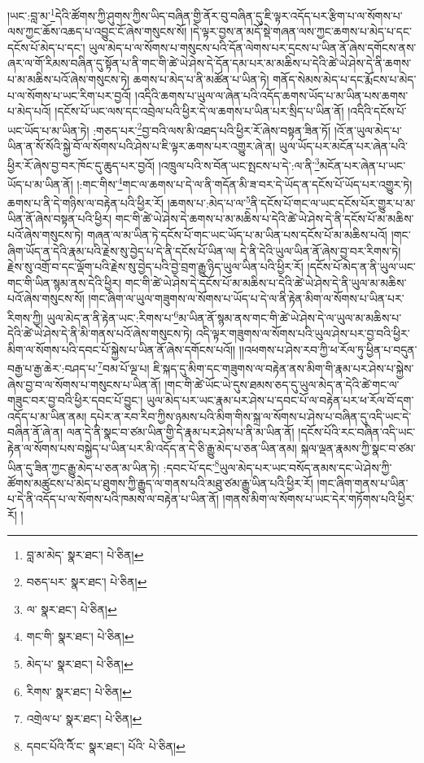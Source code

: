 །ཡང་:བླ་མ་\footnote{བླ་མ་མེད་  སྣར་ཐང་།  པེ་ཅིན། }དེའི་ཚོགས་ཀྱི་ཤུགས་ཀྱིས་ཡིད་བཞིན་གྱི་ནོར་བུ་བཞིན་དུ་ཇི་ལྟར་འདོད་པར་རྩིག་པ་ལ་སོགས་པ་ལས་ཀྱང་ཆོས་འཆད་པ་འབྱུང་ངོ་ཞེས་གསུངས་སོ། །དེ་ལྟར་བྱས་ན་མདོ་སྡེ་གཞན་ལས་ཀྱང་ཆགས་པ་མེད་པ་དང་དངོས་པོ་མེད་པ་དང་། ཡུལ་མེད་པ་ལ་སོགས་པ་གསུངས་པའི་དོན་ལེགས་པར་དྲངས་པ་ཡིན་ནོ་ཞེས་དགོངས་ནས་ཞར་ལ་གོ་རིམས་བཞིན་དུ་སྟོན་པ་ནི་གང་གི་ཚེ་ཡེ་ཤེས་དེ་དོན་དམ་པར་མ་མཆིས་པ་དེའི་ཚེ་ཡེ་ཤེས་དེ་ནི་ཆགས་པ་མ་མཆིས་པའོ་ཞེས་གསུངས་ཏེ། ཆགས་པ་མེད་པ་ནི་མཚོན་པ་ཡིན་ཏེ། གནོད་སེམས་མེད་པ་དང་རྨོངས་པ་མེད་པ་ལ་སོགས་པ་ཡང་རིག་པར་བྱའོ། །འདིའི་ཆགས་པ་ཡུལ་ལ་ཞེན་པའི་འདོད་ཆགས་ཡོད་པ་མ་ཡིན་པས་ཆགས་པ་མེད་པའོ། །དངོས་པོ་ཡང་ལས་དང་འབྲེལ་པའི་ཕྱིར་དེ་ལ་ཆགས་པ་ཡིན་པར་སྲིད་པ་ཡིན་ནོ། །འདིའི་དངོས་པོ་ཡང་ཡོད་པ་མ་ཡིན་ཏེ། :གཅད་པར་\footnote{བཅད་པར་  སྣར་ཐང་།  པེ་ཅིན། }བྱ་བའི་ལས་མི་འཐད་པའི་ཕྱིར་རོ་ཞེས་བསྟན་ཟིན་ཏོ། །འོ་ན་ཡུལ་མེད་པ་ཡིན་ན་སོ་སོའི་སྐྱེ་བོ་ལ་སོགས་པའི་ཤེས་པ་ཇི་ལྟར་ཆགས་པར་འགྱུར་ཞེ་ན། ཡུལ་ཡོད་པར་མངོན་པར་ཞེན་པའི་ཕྱིར་རོ་ཞེས་བྱ་བར་ཁོང་དུ་ཆུད་པར་བྱའོ། །འཁྲུལ་པའི་ས་བོན་ཡང་སྤངས་པ་དེ་:ལ་ནི་\footnote{ལ་  སྣར་ཐང་།  པེ་ཅིན། }མངོན་པར་ཞེན་པ་ཡང་ཡོད་པ་མ་ཡིན་ནོ། །:གང་གིས་\footnote{གང་གི་  སྣར་ཐང་།  པེ་ཅིན། }གང་ལ་ཆགས་པ་དེ་ལ་ནི་གདོན་མི་ཟ་བར་དེ་ཡོད་ན་དངོས་པོ་ཡོད་པར་འགྱུར་ཏེ། ཆགས་པ་ནི་དེ་གཉིས་ལ་བརྟེན་པའི་ཕྱིར་རོ། །ཆགས་པ་:མེད་པ་ལ་\footnote{མེད་པ་  སྣར་ཐང་།  པེ་ཅིན། }ནི་དངོས་པོ་གང་ལ་ཡང་དངོས་པོར་གྱུར་པ་མ་ཡིན་ནོ་ཞེས་བསྟན་པའི་ཕྱིར། གང་གི་ཚེ་ཡེ་ཤེས་དེ་ཆགས་པ་མ་མཆིས་པ་དེའི་ཚེ་ཡེ་ཤེས་དེ་ནི་དངོས་པོ་མ་མཆིས་པའོ་ཞེས་གསུངས་ཏེ། གཞན་ལ་མ་ཡིན་ཏེ་དངོས་པོ་གང་ཡང་ཡོད་པ་མ་ཡིན་པས་དངོས་པོ་མ་མཆིས་པའོ། །གང་ཞིག་ཡོད་ན་དེའི་རྣམ་པའི་རྗེས་སུ་བྱེད་པ་དེ་ནི་དངོས་པོ་ཡིན་ལ། དེ་ནི་དེའི་ཡུལ་ཡིན་ནོ་ཞེས་བྱ་བར་རིགས་ཏེ། རྗེས་སུ་འགྲོ་བ་དང་ལྡོག་པའི་རྗེས་སུ་བྱེད་པའི་བྱེ་བྲག་རྒྱུ་ཉིད་ཡུལ་ཡིན་པའི་ཕྱིར་རོ། །དངོས་པོ་མེད་ན་ནི་ཡུལ་ཡང་གང་གི་ཡིན་སྙམ་ནས་དེའི་ཕྱིར། གང་གི་ཚེ་ཡེ་ཤེས་དེ་དངོས་པོ་མ་མཆིས་པ་དེའི་ཚེ་ཡེ་ཤེས་དེ་ནི་ཡུལ་མ་མཆིས་པའོ་ཞེས་གསུངས་སོ། །གང་ཞིག་ལ་ཡུལ་གཟུགས་ལ་སོགས་པ་ཡོད་པ་དེ་ལ་ནི་རྟེན་མིག་ལ་སོགས་པ་ཡིན་པར་རིགས་ཀྱི། ཡུལ་མེད་ན་ནི་རྟེན་ཡང་:རིགས་པ་\footnote{རིགས་  སྣར་ཐང་།  པེ་ཅིན། }མ་ཡིན་ནོ་སྙམ་ནས་གང་གི་ཚེ་ཡེ་ཤེས་དེ་ལ་ཡུལ་མ་མཆིས་པ་དེའི་ཚེ་ཡེ་ཤེས་དེ་ནི་མི་གནས་པའོ་ཞེས་གསུངས་ཏེ། འདི་ལྟར་གཟུགས་ལ་སོགས་པའི་ཡུལ་ཤེས་པར་བྱ་བའི་ཕྱིར་མིག་ལ་སོགས་པའི་དབང་པོ་སྐྱེས་པ་ཡིན་ནོ་ཞེས་དགོངས་པའོ།། །།འཕགས་པ་ཤེས་རབ་ཀྱི་ཕ་རོལ་ཏུ་ཕྱིན་པ་བདུན་བརྒྱ་པ་རྒྱ་ཆེར་:བཤད་པ་\footnote{འགྲེལ་པ་  སྣར་ཐང་།  པེ་ཅིན། }བམ་པོ་ལྔ་པ། ཇི་སྐད་དུ་མིག་དང་གཟུགས་ལ་བརྟེན་ནས་མིག་གི་རྣམ་པར་ཤེས་པ་སྐྱེས་ཞེས་བྱ་བ་ལ་སོགས་པ་གསུངས་པ་ཡིན་ནོ། །གང་གི་ཚེ་ཡོང་ཡེ་དུས་ཐམས་ཅད་དུ་ཡུལ་མེད་ན་དེའི་ཚེ་གང་ལ་གཟུང་བར་བྱ་བའི་ཕྱིར་དབང་པོ་བྱུང་། ཡུལ་མེད་པར་ཡང་རྣམ་པར་ཤེས་པ་དབང་པོ་ལ་བརྟེན་པར་ཕ་རོལ་བོ་དག་འདོད་པ་མ་ཡིན་ནམ། དཔེར་ན་རབ་རིབ་ཀྱིས་ཉམས་པའི་མིག་གིས་སྐྲ་ལ་སོགས་པ་ཤེས་པ་བཞིན་དུ་འདི་ཡང་དེ་བཞིན་ནོ་ཞེ་ན། ལན་དེ་ནི་སྣང་བ་ཙམ་ཡིན་གྱི་དེ་རྣམ་པར་ཤེས་པ་ནི་མ་ཡིན་ནོ། །དངོས་པོའི་རང་བཞིན་འདི་ཡང་རྟེན་ལ་སོགས་པས་བསྐྱེད་པ་ཡིན་པར་མི་འདོད་ན་དེ་ཅི་རྒྱུ་མེད་པ་ཅན་ཡིན་ནམ། སྐལ་ལྡན་རྣམས་ཀྱི་སྣང་བ་ཙམ་ཡིན་དུ་ཟིན་ཀྱང་རྒྱུ་མེད་པ་ཅན་མ་ཡིན་ཏེ། :དབང་པོ་དང་\footnote{དབང་པོའི་ོའི་ང་  སྣར་ཐང་། པོའི་  པེ་ཅིན། }ཡུལ་མེད་པར་ཡང་བསོད་ནམས་དང་ཡེ་ཤེས་ཀྱི་ཚོགས་མཚུངས་པ་མེད་པ་ཐུགས་ཀྱི་རྒྱུད་ལ་གནས་པའི་མཐུ་ཙམ་རྒྱུ་ཡིན་པའི་ཕྱིར་རོ། །གང་ཞིག་གནས་པ་ཡིན་པ་དེ་ནི་འདོད་པ་ལ་སོགས་པའི་ཁམས་ལ་བརྟེན་པ་ཡིན་ནོ། །གནས་མིག་ལ་སོགས་པ་ཡང་དེར་གཏོགས་པའི་ཕྱིར་རོ། །
